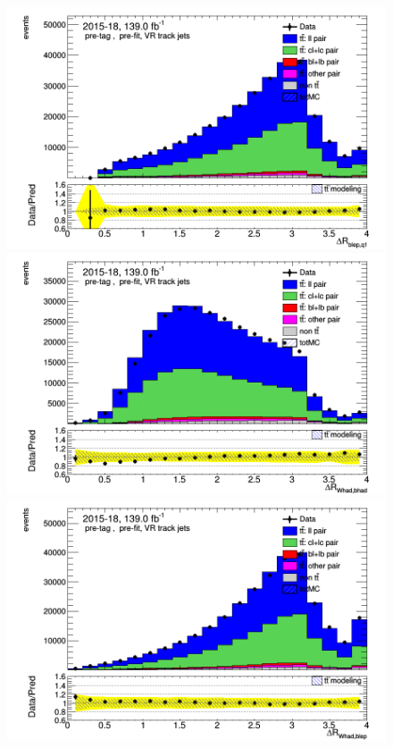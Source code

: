 \documentclass[letterpaper,12pt]{article}
\begin{document}
\begin{figure}
\begin{minipage}[b]{.45\textwidth}
	\end{minipage}\hfill
	\begin{minipage}[b]{.45\textwidth}
	\centering
	\includegraphics[width=1\textwidth]{Oct_distributions/pretagNoRwDL1rwithhighpTVRJets_scaledall/DataMC_dRblepq1.png} 
	\end{minipage}\hfill
	\begin{minipage}[b]{.45\textwidth}
	\centering
	\includegraphics[width=1\textwidth]{Oct_distributions/pretagNoRwDL1rwithhighpTVRJets_scaledall/DataMC_dRWhadbhad.png} 
	\end{minipage}\hfill
	\begin{minipage}[b]{.45\textwidth}
	\centering
	\includegraphics[width=1\textwidth]{Oct_distributions/pretagNoRwDL1rwithhighpTVRJets_scaledall/DataMC_dRWhadblep.png} 

\end{minipage}
\end{figure}
\end{document}
